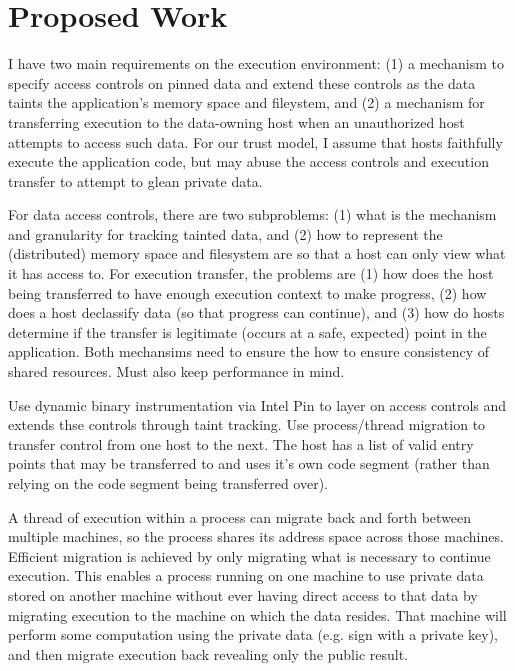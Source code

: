 \section{Proposed Work}
\label{sec:propose}


I have two main requirements on the execution environment: (1) a mechanism to
specify access controls on pinned data and extend these controls as the data
taints the application's memory space and fileystem, and (2) a mechanism for
transferring execution to the data-owning host when an unauthorized host
attempts to access such data.  
%
For our trust model, I assume that hosts faithfully execute the application
code, but may abuse the access controls and execution transfer to attempt to
glean private data.


For data access controls, there are two subproblems: (1) what is the
mechanism and granularity for tracking tainted data, and (2) how to represent the
(distributed) memory space and filesystem are so that a host can only view what
it has access to.  
%
For execution transfer, the problems are (1) how does the host being
transferred to have enough execution context to make progress, (2) how does a
host declassify data (so that progress can continue), and (3) how do hosts 
determine if the transfer is legitimate (occurs at a safe, expected) point in
the application.  
%
Both mechansims need to ensure the how to ensure consistency of shared
resources.
%
Must also keep performance in mind.

Use dynamic binary instrumentation via Intel Pin to layer on access controls
and extends thse controls through taint tracking.  Use process/thread migration
to transfer control from one host to the next.  The host has a list of valid
entry points that may be transferred to and uses it's own code segment (rather
than relying on the code segment being transferred over).

A thread of execution within a process can migrate back and forth between
multiple machines, so the process shares its address space across those
machines.  Efficient migration is achieved by only migrating what is necessary
to continue execution.  This enables a process running on one machine to use
private data stored on another machine without ever having direct access to
that data by migrating execution to the machine on which the data resides.  That
machine will perform some computation using the private data (e.g. sign with a
private key), and then migrate execution back revealing only the public
result.

